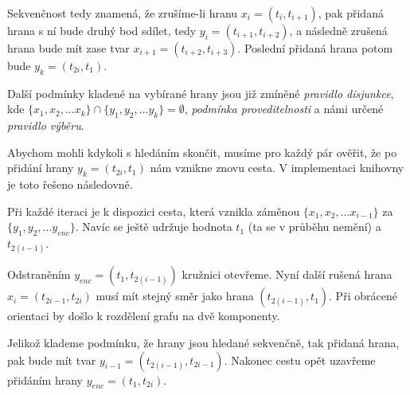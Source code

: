 \documentclass[
  printversion=false,
  joinlists=true,
  glossaries=true,
  figures=true,
  tables=true,
  sourcecodes=false,
  theorems=false,
  bibencoding=utf8,
  language=czech,
  encoding=utf8,
  program=infpvs,
  index=true,
  biblatex=true
]{kidiplom}
\begin{document}
Sekvenčnost tedy znamená, že zrušíme-li hranu $x_i = (t_i, t_{i+1})$, pak přidaná hrana s ní bude druhý bod sdílet, tedy $y_i = (t_{i+1}, t_{i+2})$, a následně zrušená hrana bude mít zase tvar $x_{i+1} = (t_{i+2}, t_{i+3})$. Poslední přidaná hrana potom bude $y_k = (t_{2i}, t_1)$.

\hspace{6.5mm}Další podmínky kladené na vybírané hrany jsou již zmíněné \textit{pravidlo disjunkce}, kde $\{x_1, x_2, ... x_k\} \cap \{y_1, y_2, ... y_k\} = \emptyset$, \textit{podmínka proveditelnosti} a námi určené \textit{pravidlo výběru}.

\hspace{6.5mm}Abychom mohli kdykoli s hledáním skončit, musíme pro každý pár ověřit, že po přidání hrany $y_k = (t_{2i}, t_1)$ nám vznikne znovu cesta. V implementaci knihovny je toto řešeno následovně.

\hspace{6.5mm}Při každé iteraci je k dispozici cesta, která vznikla záměnou $\{x_1, x_2, ... x_{i-1}\}$ za $\{y_1, y_2, ... y_{enc}\}$. Navíc se ještě udržuje hodnota $t_1$ (ta se v průběhu nemění) a~$t_{2(i-1)}$.

\hspace{6.5mm}Odstraněním $y_{enc} = (t_1, t_{2(i-1)})$ kružnici otevřeme. Nyní další rušená hrana $x_i = (t_{2i-1}, t_{2i})$ musí mít stejný směr jako hrana $(t_{2(i-1)}, t_1)$. Při obrácené orientaci by došlo k rozdělení grafu na dvě komponenty.

\hspace{6.5mm}Jelikož klademe podmínku, že hrany jsou hledané sekvenčně, tak přidaná hrana, pak bude mít tvar $y_{i-1} = (t_{2(i-1)}, t_{2i-1})$. Nakonec cestu opět uzavřeme přidáním hrany $y_{enc} = (t_1, t_{2i})$.
\end{document}
